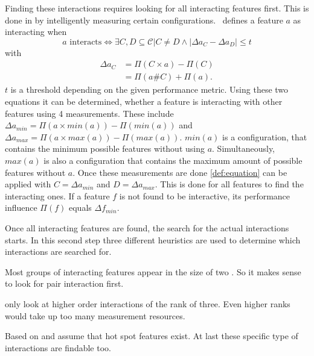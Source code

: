 Finding these interactions requires looking for all interacting features first. This is done in by intelligently measuring certain configurations. \AFID~defines a feature $a$ as interacting when
\begin{equation}\label{def:equation}
a \text{ interacts} \Leftrightarrow \exists C,D \subseteq \mathcal{C}| C \neq D  \land	 |\Delta a_C - \Delta a_D| \leq t
\end{equation}
with 
\begin{equation}
\begin{split}
\Delta a_C &= \Pi(C\times a) - \Pi(C)\\
&=\Pi(a\# C) + \Pi(a).
\end{split}
\end{equation}
$t$ is a threshold depending on the given performance metric.
Using these two equations it can be determined, whether a feature is interacting with other features using 4 measurements.
These include $\Delta a_{min} = \Pi(a \times min(a)) - \Pi(min(a))$ and $\Delta a_{max} = \Pi(a \times max(a)) - \Pi(max(a))$. $min(a)$ is a configuration, that contains the minimum possible features without using $a$. Simultaneously, $max(a)$ is also a configuration that contains the maximum amount of possible features without $a$. 
Once these measurements are done \cref{def:equation} can be applied with $C=\Delta a_{min}$ and $D=\Delta a_{max}$. This is done for all features to find the interacting ones.
If a feature $f$ is not found to be interactive, its performance influence $\Pi(f)$ equals $\Delta f_{min}$.

Once all interacting features are found, the search for the actual interactions starts. In this second step three different heuristics are used to determine which interactions are searched for.
 
 \newcommand{\oitem}[2]{{\item[{\parbox[t][0pt][t]{\leftmargin}{\raggedleft #1}}] {\parbox[t]{\textwidth-\leftmargin}{#2}}}}
 \begin{itemize}[leftmargin=4cm]
 	\setlength\itemsep{1em}
 	\oitem{Pair-Wise~Heuristic (PW):\label{lab:PW}}{ Most groups of interacting features appear in the size of two \cite{AutomatedFeatureDetectionSiegmund2012,AnalysisOfTheVariabilityInFortyPreprocessor_BasedSPLLiebig}. So it makes sense to look for pair interaction first.}
 	\oitem{Higher-Order Interactions Heuristic (HO):\label{lab:HO}}{
 		\citet{AutomatedFeatureDetectionSiegmund2012} only look at higher order interactions of the rank of three. Even higher ranks would take up too many measurement resources.
 	}
 	\oitem{Hot-Spot Features Heuristic(HS):\label{lab:HS}}{
 		Based on \cite{FeatureCohesioninSPL} and \cite{CanWeAvoidHighCoupling?} \citet{AutomatedFeatureDetectionSiegmund2012} assume that hot spot features exist. At last these specific type of interactions are findable too.
 	}
 \end{itemize}

